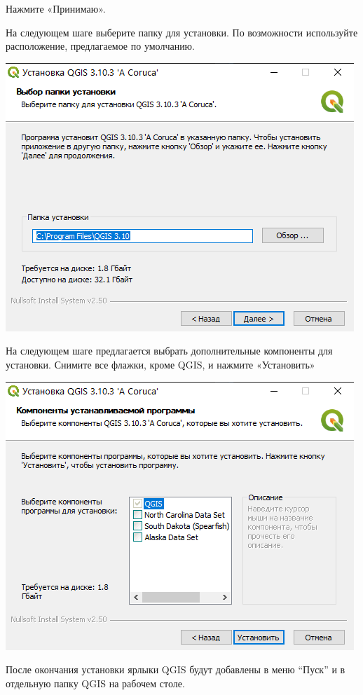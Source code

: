 \documentclass[
  12pt,
]{book}
\begin{document}
Нажмите «Принимаю».

На следующем шаге выберите папку для установки. По возможности используйте расположение, предлагаемое по умолчанию.

\includegraphics{images/installation_instruction_win/win03.png}

На следующем шаге предлагается выбрать дополнительные компоненты для установки. Снимите все флажки, кроме QGIS, и нажмите «Установить»

\includegraphics{images/installation_instruction_win/win04.png}

После окончания установки ярлыки QGIS будут добавлены в меню ``Пуск'' и в отдельную папку QGIS на рабочем столе.
\end{document}

